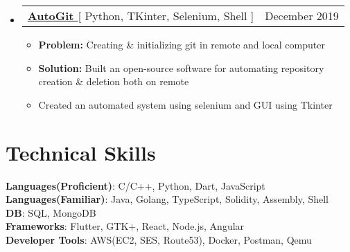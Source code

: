 \documentclass[letterpaper,11pt]{article}
\makeatletter
\newcommand{\resumeItem}[1]{
  \item\small{
    {#1 \vspace{-2pt}}
  }
}
\newcommand{\resumeProjectHeading}[2]{
    \item
    \begin{tabular*}{0.97\textwidth}{l@{\extracolsep{\fill}}r}
      \small#1 & #2 \\
    \end{tabular*}\vspace{-7pt}
}
\newcommand{\resumeSubHeadingListStart}{\begin{itemize}[leftmargin=0.15in, label={}]}
\newcommand{\resumeSubHeadingListEnd}{\end{itemize}}
\newcommand{\resumeItemListStart}{\begin{itemize}}
\newcommand{\resumeItemListEnd}{\end{itemize}\vspace{-5pt}}
\makeatother
\begin{document}
    \resumeSubHeadingListStart
      \resumeProjectHeading
          {\textbf{\href{https://pub.dev/packages/AutoGit}{AutoGit }}{[ Python, TKinter, Selenium, Shell ]}}{December 2019}
          \resumeItemListStart
           \resumeItem{\textbf{Problem:} Creating \& initializing git in remote and local computer}
           \resumeItem{\textbf{Solution:} Built an open-source software for automating repository creation \& deletion both on remote }
           \resumeItem{ Created an automated system using selenium and GUI using Tkinter}
          \resumeItemListEnd
    \resumeSubHeadingListEnd


%
\section{Technical Skills}
 \begin{itemize}[leftmargin=0.15in, label={}]
    \small{\item{
     \textbf{Languages(Proficient)}{: C/C++, Python, Dart, JavaScript } \\
      \textbf{Languages(Familiar)}{: Java, Golang, TypeScript, Solidity, Assembly, Shell } \\
      \textbf{DB}{: SQL, MongoDB} \\
     \textbf{Frameworks}{: Flutter, GTK+, React, Node.js, Angular } \\
     \textbf{Developer Tools}{: AWS(EC2, SES, Route53), Docker, Postman, Qemu } \\
    }}
 \end{itemize}

 
\end{document}
